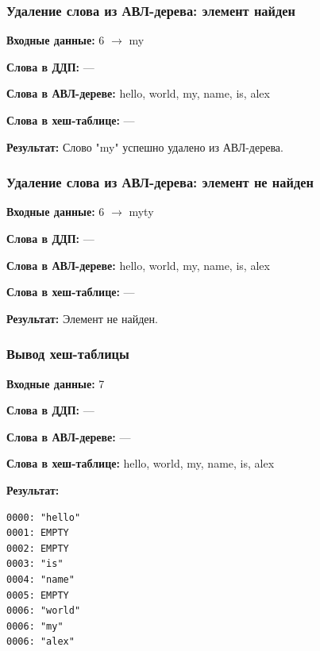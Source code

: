 \documentclass[a4paper,12pt]{extarticle}
\begin{document}
\subsubsection{Удаление слова из АВЛ-дерева: элемент найден}

\textbf{Входные данные: }
6 $\rightarrow$ my

\textbf{Слова в ДДП: }
---

\textbf{Слова в АВЛ-дереве: }
hello, world, my, name, is, alex

\textbf{Слова в хеш-таблице: }
---

\textbf{Результат: }
Слово "my" успешно удалено из АВЛ-дерева.


\subsubsection{Удаление слова из АВЛ-дерева: элемент не найден}

\textbf{Входные данные: }
6 $\rightarrow$ myty

\textbf{Слова в ДДП: }
---

\textbf{Слова в АВЛ-дереве: }
hello, world, my, name, is, alex

\textbf{Слова в хеш-таблице: }
---

\textbf{Результат: }
Элемент не найден.




















\subsubsection{Вывод хеш-таблицы}

\textbf{Входные данные: }
7

\textbf{Слова в ДДП: }
---

\textbf{Слова в АВЛ-дереве: }
---

\textbf{Слова в хеш-таблице: }
hello, world, my, name, is, alex

\textbf{Результат: }

\begin{verbatim}
0000: "hello"
0001: EMPTY
0002: EMPTY
0003: "is"
0004: "name"
0005: EMPTY
0006: "world"
0006: "my"
0006: "alex"
\end{verbatim}
\end{document}
